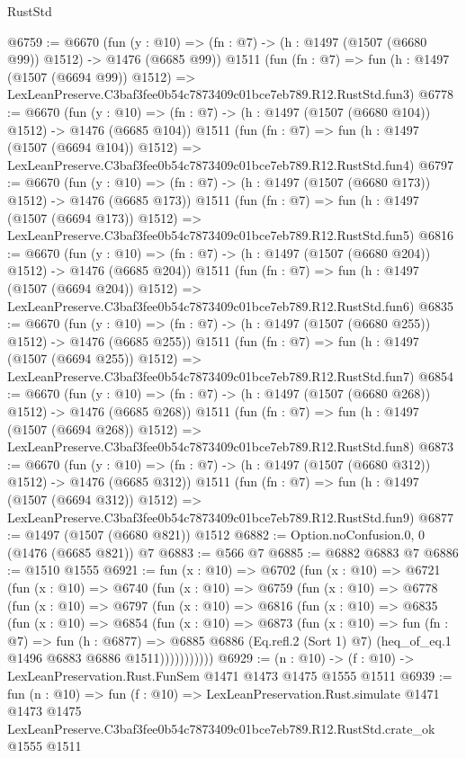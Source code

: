 \begin{lexlean}{RustStd}
\begin{coremodule}
@6759 := @6670
    (fun (y : @10) => (fn : @7) -> (h : @1497 (@1507 (@6680 @99)) @1512) -> @1476 (@6685 @99))
    @1511
    (fun (fn : @7) =>
    fun (h : @1497 (@1507 (@6694 @99)) @1512) =>
    LexLeanPreserve.C3baf3fee0b54c7873409c01bce7eb789.R12.RustStd.fun3)
@6778 := @6670
    (fun (y : @10) => (fn : @7) -> (h : @1497 (@1507 (@6680 @104)) @1512) -> @1476 (@6685 @104))
    @1511
    (fun (fn : @7) =>
    fun (h : @1497 (@1507 (@6694 @104)) @1512) =>
    LexLeanPreserve.C3baf3fee0b54c7873409c01bce7eb789.R12.RustStd.fun4)
@6797 := @6670
    (fun (y : @10) => (fn : @7) -> (h : @1497 (@1507 (@6680 @173)) @1512) -> @1476 (@6685 @173))
    @1511
    (fun (fn : @7) =>
    fun (h : @1497 (@1507 (@6694 @173)) @1512) =>
    LexLeanPreserve.C3baf3fee0b54c7873409c01bce7eb789.R12.RustStd.fun5)
@6816 := @6670
    (fun (y : @10) => (fn : @7) -> (h : @1497 (@1507 (@6680 @204)) @1512) -> @1476 (@6685 @204))
    @1511
    (fun (fn : @7) =>
    fun (h : @1497 (@1507 (@6694 @204)) @1512) =>
    LexLeanPreserve.C3baf3fee0b54c7873409c01bce7eb789.R12.RustStd.fun6)
@6835 := @6670
    (fun (y : @10) => (fn : @7) -> (h : @1497 (@1507 (@6680 @255)) @1512) -> @1476 (@6685 @255))
    @1511
    (fun (fn : @7) =>
    fun (h : @1497 (@1507 (@6694 @255)) @1512) =>
    LexLeanPreserve.C3baf3fee0b54c7873409c01bce7eb789.R12.RustStd.fun7)
@6854 := @6670
    (fun (y : @10) => (fn : @7) -> (h : @1497 (@1507 (@6680 @268)) @1512) -> @1476 (@6685 @268))
    @1511
    (fun (fn : @7) =>
    fun (h : @1497 (@1507 (@6694 @268)) @1512) =>
    LexLeanPreserve.C3baf3fee0b54c7873409c01bce7eb789.R12.RustStd.fun8)
@6873 := @6670
    (fun (y : @10) => (fn : @7) -> (h : @1497 (@1507 (@6680 @312)) @1512) -> @1476 (@6685 @312))
    @1511
    (fun (fn : @7) =>
    fun (h : @1497 (@1507 (@6694 @312)) @1512) =>
    LexLeanPreserve.C3baf3fee0b54c7873409c01bce7eb789.R12.RustStd.fun9)
@6877 := @1497 (@1507 (@6680 @821)) @1512
@6882 := Option.noConfusion.{0, 0} (@1476 (@6685 @821)) @7
@6883 := @566 @7
@6885 := @6882 @6883 @7
@6886 := @1510 @1555
@6921 := fun (x : @10) =>
  @6702
    (fun (x : @10) =>
    @6721
      (fun (x : @10) =>
      @6740
        (fun (x : @10) =>
        @6759
          (fun (x : @10) =>
          @6778
            (fun (x : @10) =>
            @6797
              (fun (x : @10) =>
              @6816
                (fun (x : @10) =>
                @6835
                  (fun (x : @10) =>
                  @6854
                    (fun (x : @10) =>
                    @6873
                      (fun (x : @10) =>
                      fun (fn : @7) =>
                      fun (h : @6877) =>
                      @6885
                        @6886
                        (Eq.refl.{2} (Sort 1) @7)
                        (heq_of_eq.{1} @1496 @6883 @6886 @1511)))))))))))
@6929 := (n : @10) -> (f : @10) -> LexLeanPreservation.Rust.FunSem @1471 @1473 @1475 @1555 @1511
@6939 := fun (n : @10) =>
  fun (f : @10) =>
  LexLeanPreservation.Rust.simulate
    @1471
    @1473
    @1475
    LexLeanPreserve.C3baf3fee0b54c7873409c01bce7eb789.R12.RustStd.crate_ok
    @1555
    @1511
\end{coremodule}
\end{lexlean}
